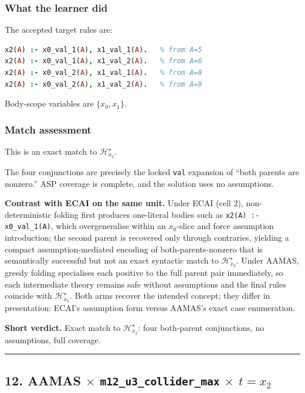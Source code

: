 \documentclass[11pt]{article}
\begin{document}
\subsubsection{What the learner did}

The accepted target rules are:

\begin{lstlisting}[style=logic,language=Prolog]
x2(A) :- x0_val_1(A), x1_val_1(A).   % from A=5
x2(A) :- x0_val_1(A), x1_val_2(A).   % from A=6
x2(A) :- x0_val_2(A), x1_val_1(A).   % from A=8
x2(A) :- x0_val_2(A), x1_val_2(A).   % from A=9
\end{lstlisting}

Body-scope variables are \(\{x_0,x_1\}\).

\subsubsection{Match assessment}

This is an exact match to \(\mathcal{H}_{x_2}^\star\).

The four conjunctions are precisely the locked \texttt{val} expansion of ``both parents are nonzero.'' ASP coverage is complete, and the solution uses no assumptions.

\textbf{Contrast with ECAI on the same unit.} Under ECAI (cell 2), non-deterministic folding first produces one-literal bodies such as \texttt{x2(A) :- x0\_val\_1(A)}, which overgeneralise within an \(x_0\)-slice and force assumption introduction; the second parent is recovered only through contraries, yielding a compact assumption-mediated encoding of both-parents-nonzero that is semantically successful but not an exact syntactic match to \(\mathcal{H}_{x_2}^\star\). Under AAMAS, greedy folding specialises each positive to the full parent pair immediately, so each intermediate theory remains safe without assumptions and the final rules coincide with \(\mathcal{H}_{x_2}^\star\). Both arms recover the intended concept; they differ in presentation: ECAI's assumption form versus AAMAS's exact case enumeration.

\textbf{Short verdict.} Exact match to \(\mathcal{H}_{x_2}^\star\): four both-parent conjunctions, no assumptions, full coverage.

\medskip\hrule\medskip

\subsection{\texorpdfstring{12. AAMAS \(\times\) \texttt{m12\_u3\_collider\_max} \(\times\) \(t=x_2\)}{12. AAMAS - m12-u3-collider-max - target x2}}
\end{document}
